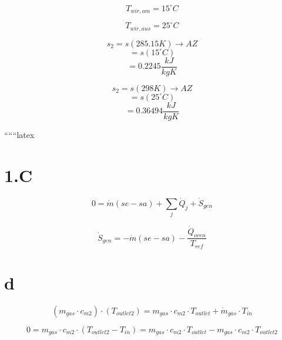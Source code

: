 \begin{equation*}
T_{wir, am} = 15^\circ C
\end{equation*}

\begin{equation*}
T_{wir, aus} = 25^\circ C
\end{equation*}

\begin{equation*}
s_2 = s (285.15 K) \rightarrow AZ
\end{equation*}
\begin{equation*}
= s (15^\circ C)
\end{equation*}
\begin{equation*}
= 0.2245 \frac{kJ}{kgK}
\end{equation*}

\begin{equation*}
s_2 = s (298 K) \rightarrow AZ
\end{equation*}
\begin{equation*}
= s (25^\circ C)
\end{equation*}
\begin{equation*}
= 0.36494 \frac{kJ}{kgK}
\end{equation*}

``````latex


\section*{1.C}
\begin{equation*}
0 = \dot{m} (se - sa) + \sum_{j} \dot{Q}_j + \dot{S}_{gen}
\end{equation*}

\begin{equation*}
\dot{S}_{gen} = - \dot{m} (se - sa) - \frac{\dot{Q}_{oven}}{T_{ref}}
\end{equation*}

\section*{d}
\begin{equation*}
(m_{gas} \cdot c_{m2}) \cdot (T_{outlet2}) = m_{gas} \cdot c_{m2} \cdot T_{outlet} + \dot{m}_{gas} \cdot T_{in}
\end{equation*}

\begin{equation*}
0 = m_{gas} \cdot c_{m2} \cdot (T_{outlet2} - T_{in}) = m_{gas} \cdot c_{m2} \cdot T_{outlet} - m_{gas} \cdot c_{m2} \cdot T_{outlet2}
\end{equation*}

